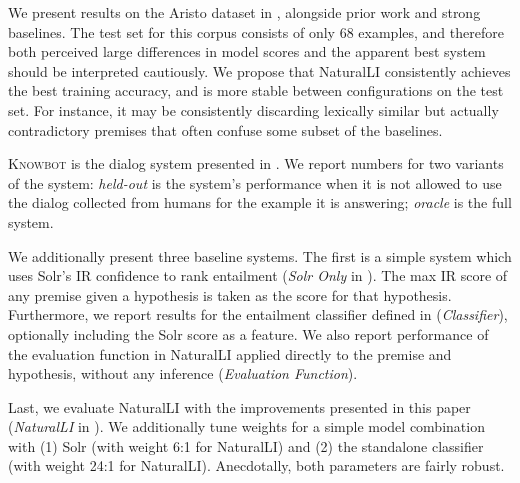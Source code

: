 %
%
We present results on the Aristo dataset in ,
  alongside prior work and strong baselines.
The test set for this corpus consists of only 68 examples,
  and therefore both perceived large differences in model scores 
  and the apparent best system should be interpreted cautiously.
We propose that NaturalLI consistently achieves the best training accuracy,
  and is more stable between configurations on the test set.
For instance,
  it may be consistently discarding lexically similar but actually contradictory
  premises that often confuse some subset of the baselines.

\textsc{Knowbot} is the dialog system presented in 
  .
We report numbers for two variants of the system:
  \textit{held-out} is the system's performance when it is not allowed
  to use the dialog collected from humans for the example it is answering;
  \textit{oracle} is the full system.

We additionally present three baseline systems.
The first is a simple system which uses Solr's IR confidence to rank
  entailment (\textit{Solr Only} in ).
The max IR score of any premise given a hypothesis is taken
  as the score for that hypothesis.
Furthermore, we report results for the entailment classifier defined
  in  (\textit{Classifier}), optionally
  including the Solr score as a feature.
We also report performance of the evaluation function in NaturalLI
  applied directly to the premise and hypothesis, without any inference
  (\textit{Evaluation Function}).

Last, we evaluate NaturalLI with the improvements presented in this paper
  (\textit{NaturalLI} in ).
We additionally tune weights for a 
  simple model combination with
  (1) Solr (with weight 6:1 for NaturalLI) and 
  (2) the standalone classifier (with weight 24:1 for NaturalLI).
Anecdotally, both parameters are fairly robust.


